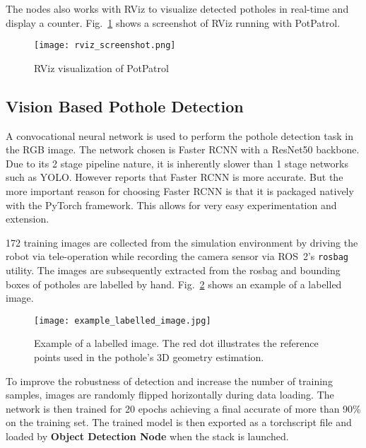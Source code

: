 \documentclass[conference]{IEEEtran}
\begin{document}
The nodes also works with RViz to visualize detected potholes in real-time and display a counter. Fig.~\ref{fig:rviz_visualisation} shows a screenshot of RViz running with PotPatrol.

\begin{figure}
    \centering
    \texttt{[image: rviz\_screenshot.png]}
    \caption{RViz visualization of PotPatrol}
    \label{fig:rviz_visualisation}
\end{figure}

\subsection{Vision Based Pothole Detection}

A convocational neural network is used to perform the pothole detection task in the RGB image. The network chosen is Faster RCNN\cite{renFasterRCNNRealTime2016} with a ResNet50\cite{heDeepResidualLearning2015} backbone. Due to its 2 stage pipeline nature, it is inherently slower than 1 stage networks such as YOLO\cite{redmonYOLOv3IncrementalImprovement2018}. However \cite{redmonYOLOv3IncrementalImprovement2018} reports that Faster RCNN is more accurate. But the more important reason for choosing Faster RCNN is that it is packaged natively with the PyTorch framework. This allows for very easy experimentation and extension.

172 training images are collected from the simulation environment by driving the robot via tele-operation while recording the camera sensor via ROS~2's \verb|rosbag| utility. The images are subsequently extracted from the rosbag and bounding boxes of potholes are labelled by hand. Fig.~\ref{fig:example_labelled_image} shows an example of a labelled image.

\begin{figure}
    \centering
    \texttt{[image: example\_labelled\_image.jpg]}
    \caption{Example of a labelled image. The red dot illustrates the reference points used in the pothole's 3D geometry estimation.}
    \label{fig:example_labelled_image}
\end{figure}

To improve the robustness of detection and increase the number of training samples, images are randomly flipped horizontally during data loading. The network is then trained for 20 epochs achieving a final accurate of more than 90\% on the training set. The trained model is then exported as a torchscript file and loaded by \textbf{Object Detection Node} when the stack is launched.
\end{document}
